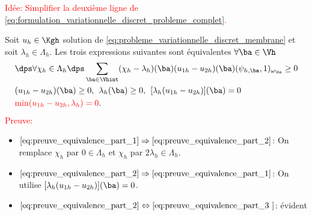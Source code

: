 \documentclass{beamer}
\begin{document}
\begin{frame}
\textcolor{red}{Idée: Simplifier la deuxième ligne de \eqref{eq:formulation_variationnelle_discret_probleme_complet}.}
\begin{theorem}
Soit $u_h\in\Kgh$ solution de \eqref{eq:probleme_variationnelle_discret_membrane} et soit $\lambda_h\in\Lambda_h$. Les trois expressions suivantes sont équivalentes $\forall \ba \in \Vh$
\begin{align}
& \dps \forall \chi_h \in \Lambda_h \dps \sum_{{\ba}\in \Vhint}(\chi_h-\lambda_h)({\ba})(u_{1h}-u_{2h})({\ba})(\psi_{h,\ba},1)_{\omega_{\ba}}\geq 0 
\label{eq:preuve_equivalence_part_1}
\\
& (u_{1h}-u_{2h})(\ba) \geq 0, \hspace{0.15 cm} \lambda_h(\ba) \geq 0, \hspace{0.15 cm} [\lambda_h (u_{1h}-u_{2h})](\ba)=0
\label{eq:preuve_equivalence_part_2}
\\
& \textcolor{red}{\min(u_{1h}-u_{2h},\lambda_h)=0}.
\label{eq:preuve_equivalence_part_3 }
\end{align}
\textcolor{red}{Preuve:}
\begin{itemize}
\item $\eqref{eq:preuve_equivalence_part_1}
\Rightarrow \eqref{eq:preuve_equivalence_part_2}$:
On remplace $\chi_h$ par $0\in \Lambda_h$ et $\chi_h$ par $2\lambda_h\in\Lambda_h$.
\item $\eqref{eq:preuve_equivalence_part_2} \Rightarrow \eqref{eq:preuve_equivalence_part_1}$: On utilise $[\lambda_h (u_{1h}-u_{2h})](\ba)=0$.
\item $ \eqref{eq:preuve_equivalence_part_2} \Leftrightarrow \eqref {eq:preuve_equivalence_part_3 }$: évident
\end{itemize}

\end{theorem}
\end{frame}
\end{document}
